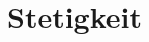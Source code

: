\documentclass[../Maxima_Workbook.tex]{subfiles}
\begin{document}
	
\chapter{Stetigkeit}
\end{document}
